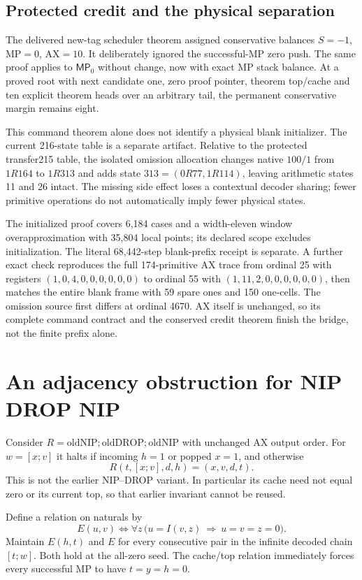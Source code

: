 \documentclass[11pt]{article}
\newcommand{\MP}{\mathsf{MP}_0}
\begin{document}
\subsection*{Protected credit and the physical separation}
The delivered new-tag scheduler theorem assigned conservative balances $S=-1$, MP$=0$, AX$=10$. It deliberately ignored the successful-MP zero push. The same proof applies to $\MP$ without change, now with exact MP stack balance. At a proved root with next candidate one, zero proof pointer, theorem top/cache and ten explicit theorem heads over an arbitrary tail, the permanent conservative margin remains eight.

This command theorem alone does not identify a physical blank initializer. The current 216-state table is a separate artifact. Relative to the protected transfer215 table, the isolated omission allocation changes native $100/1$ from $1R164$ to $1R313$ and adds state $313=(0R77,1R114)$, leaving arithmetic states 11 and 26 intact. The missing side effect loses a contextual decoder sharing; fewer primitive operations do not automatically imply fewer physical states.

The initialized proof covers 6,184 cases and a width-eleven window overapproximation with 35,804 local points; its declared scope excludes initialization. The literal 68,442-step blank-prefix receipt is separate. A further exact check reproduces the full 174-primitive AX trace from ordinal 25 with registers $(1,0,4,0,0,0,0,0,0)$ to ordinal 55 with $(1,11,2,0,0,0,0,0,0)$, then matches the entire blank frame with 59 spare ones and 150 one-cells. The omission source first differs at ordinal 4670. AX itself is unchanged, so its complete command contract and the conserved credit theorem finish the bridge, not the finite prefix alone.

\section{An adjacency obstruction for NIP DROP NIP}
Consider $R=\mathrm{oldNIP};\mathrm{oldDROP};\mathrm{oldNIP}$ with unchanged AX output order. For $w=[x;v]$ it halts if incoming $h=1$ or popped $x=1$, and otherwise
\[
 R(t,[x;v],d,h)=(x,v,d,t).
\]
This is not the earlier NIP--DROP variant. In particular its cache need not equal zero or its current top, so that earlier invariant cannot be reused.

Define a relation on naturals by
\[
 E(u,v)\iff\forall z\,\bigl(u=I(v,z)\ \Longrightarrow\ u=v=z=0\bigr).
\]
Maintain $E(h,t)$ and $E$ for every consecutive pair in the infinite decoded chain $[t;w]$. Both hold at the all-zero seed. The cache/top relation immediately forces every successful MP to have $t=y=h=0$.
\end{document}

